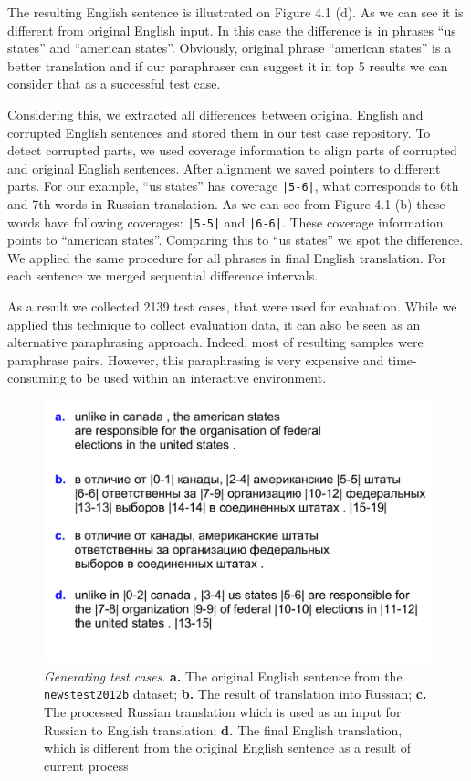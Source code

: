 The resulting English sentence is illustrated on Figure 4.1 (d). As we can see it is different from original English input. In this case the difference is in phrases ``us states'' and ``american states''. Obviously, original phrase ``american states'' is a better translation and if our paraphraser can suggest it in top 5 results we can consider that as a successful test case. 

Considering this, we extracted all differences between original English and corrupted English sentences and stored them in our test case repository. To detect corrupted parts, we used coverage information to align parts of corrupted and original English sentences. After alignment we saved pointers to different parts. For our example, ``us states'' has coverage \texttt{|5-6|}, what corresponds to 6th and 7th words in Russian translation. As we can see from Figure 4.1 (b) these words have following coverages: \texttt{|5-5|} and \texttt{|6-6|}. These coverage information points to ``american states''. Comparing this to ``us states'' we spot the difference. We applied the same procedure for all phrases in final English translation. For each sentence we merged sequential difference intervals.

As a result we collected 2139 test cases, that were used for evaluation. While we applied this technique to collect evaluation data, it can also be seen as an alternative paraphrasing approach. Indeed, most of resulting samples were paraphrase pairs. However, this paraphrasing is very expensive and time-consuming to be used within an interactive environment. 

\begin{figure}
 \centering 
 \includegraphics[scale=0.75]{g/rus-sample1.pdf}
 \caption{\emph{Generating test cases}. \textbf{a.} The original English sentence from the \texttt{newstest2012b} dataset; \textbf{b.} The result of translation into Russian; \textbf{c.} The processed Russian translation which is used as an input for Russian to English translation; \textbf{d.} The final English translation, which is different from the original English sentence as a result of current process }
\end{figure}

